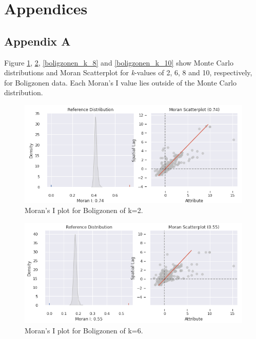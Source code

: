 \documentclass{article}
\begin{document}


\section*{Appendices}

\subsection{Appendix A}
\label{appendix_a}

Figure \ref{boligzonen_k_2}, \ref{boligzonen_k_6}, \ref{boligzonen_k_8} and \ref{boligzonen_k_10} show Monte Carlo distributions and Moran Scatterplot for \textit{k}-values of 2, 6, 8 and 10, respectively, for Boligzonen data. Each Moran's I value lies outside of the Monte Carlo distribution.

\begin{figure}[H]
    \centering
    \includegraphics[width=1\textwidth]{images/morans_i_k_2.png}
    \caption{Moran's I plot for Boligzonen of k=2.}
    \label{boligzonen_k_2}
\end{figure}

\begin{figure}[H]
    \centering
    \includegraphics[width=1\textwidth]{images/morans_i_k_6.png}
    \caption{Moran's I plot for Boligzonen of k=6.}
    \label{boligzonen_k_6}
\end{figure}
\end{document}
